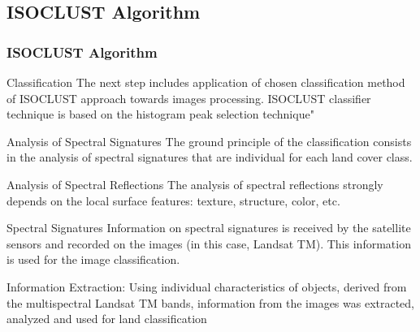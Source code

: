 \documentclass[pdflatex,compress,8pt,
	xcolor={dvipsnames,dvipsnames,svgnames,x11names,table},
	hyperref={	
	breaklinks = true, 
	pdfauthor={Lemenkova Polina}, 
	pdfsubject={Preentation}, 
	pdfcreator={Lemenkova Polina}, 
	pdfproducer={Lemenkova Polina}, 
	colorlinks=true,
	linkcolor=Tomato, 
	citecolor=DeepPink3, 
	urlcolor = NavyBlue, 
	breaklinks = true}]{beamer}
\begin{document}
\subsection{ISOCLUST Algorithm}
\begin{frame}\frametitle{ISOCLUST Algorithm}
\vspace{3em}
	\begin{block}{Classification}
The next step includes application of chosen classification method of ISOCLUST approach towards images processing. ISOCLUST classifier technique is based on the histogram peak selection technique"
	\end{block}

	\begin{block}{Analysis of Spectral Signatures}
The ground principle of the classification consists in the analysis of spectral signatures that are individual for each land cover class.
	\end{block}

	\begin{block}{Analysis of Spectral Reflections}
The analysis of spectral reflections strongly depends on the local surface features: texture, structure, color, etc.
	\end{block}

	\begin{block}{Spectral Signatures}
Information on spectral signatures is received by the satellite sensors and recorded on the images (in this case, Landsat TM). This information is used for the image classification.
	\end{block}
	
	\begin{examples}{Information Extraction:}
Using individual characteristics of objects, derived from the multispectral Landsat TM bands, information from the images was extracted, analyzed and used for land classification
	\end{examples}

\end{frame}
\end{document}
